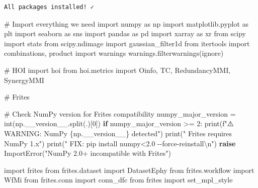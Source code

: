 \documentclass[
  11pt,
  letterpaper,
  oneside,
  openany]{book}
\newenvironment{Shaded}{\begin{snugshade}}{\end{snugshade}}
\newcommand{\BuiltInTok}[1]{\textcolor[rgb]{0.00,0.23,0.31}{#1}}
\newcommand{\CharTok}[1]{\textcolor[rgb]{0.13,0.47,0.30}{#1}}
\newcommand{\CommentTok}[1]{\textcolor[rgb]{0.37,0.37,0.37}{#1}}
\newcommand{\ControlFlowTok}[1]{\textcolor[rgb]{0.00,0.23,0.31}{\textbf{#1}}}
\newcommand{\DecValTok}[1]{\textcolor[rgb]{0.68,0.00,0.00}{#1}}
\newcommand{\ImportTok}[1]{\textcolor[rgb]{0.00,0.46,0.62}{#1}}
\newcommand{\NormalTok}[1]{\textcolor[rgb]{0.00,0.23,0.31}{#1}}
\newcommand{\OperatorTok}[1]{\textcolor[rgb]{0.37,0.37,0.37}{#1}}
\newcommand{\PreprocessorTok}[1]{\textcolor[rgb]{0.68,0.00,0.00}{#1}}
\newcommand{\SpecialCharTok}[1]{\textcolor[rgb]{0.37,0.37,0.37}{#1}}
\newcommand{\SpecialStringTok}[1]{\textcolor[rgb]{0.13,0.47,0.30}{#1}}
\newcommand{\StringTok}[1]{\textcolor[rgb]{0.13,0.47,0.30}{#1}}
\begin{document}
\begin{verbatim}
All packages installed! ✓
\end{verbatim}

\begin{Shaded}
\begin{Highlighting}[]
\CommentTok{\# Import everything we need}
\ImportTok{import}\NormalTok{ numpy }\ImportTok{as}\NormalTok{ np}
\ImportTok{import}\NormalTok{ matplotlib.pyplot }\ImportTok{as}\NormalTok{ plt}
\ImportTok{import}\NormalTok{ seaborn }\ImportTok{as}\NormalTok{ sns}
\ImportTok{import}\NormalTok{ pandas }\ImportTok{as}\NormalTok{ pd}
\ImportTok{import}\NormalTok{ xarray }\ImportTok{as}\NormalTok{ xr}
\ImportTok{from}\NormalTok{ scipy }\ImportTok{import}\NormalTok{ stats}
\ImportTok{from}\NormalTok{ scipy.ndimage }\ImportTok{import}\NormalTok{ gaussian\_filter1d}
\ImportTok{from}\NormalTok{ itertools }\ImportTok{import}\NormalTok{ combinations, product}
\ImportTok{import}\NormalTok{ warnings}
\NormalTok{warnings.filterwarnings(}\StringTok{\textquotesingle{}ignore\textquotesingle{}}\NormalTok{)}

\CommentTok{\# HOI}
\ImportTok{import}\NormalTok{ hoi}
\ImportTok{from}\NormalTok{ hoi.metrics }\ImportTok{import}\NormalTok{ Oinfo, TC, RedundancyMMI, SynergyMMI}

\CommentTok{\# Frites}

\CommentTok{\# Check NumPy version for Frites compatibility}
\NormalTok{numpy\_major\_version }\OperatorTok{=} \BuiltInTok{int}\NormalTok{(np.\_\_version\_\_.split(}\StringTok{\textquotesingle{}.\textquotesingle{}}\NormalTok{)[}\DecValTok{0}\NormalTok{])}
\ControlFlowTok{if}\NormalTok{ numpy\_major\_version }\OperatorTok{\textgreater{}=} \DecValTok{2}\NormalTok{:}
    \BuiltInTok{print}\NormalTok{(}\SpecialStringTok{f"⚠️  WARNING: NumPy }\SpecialCharTok{\{}\NormalTok{np}\SpecialCharTok{.}\NormalTok{\_\_version\_\_}\SpecialCharTok{\}}\SpecialStringTok{ detected"}\NormalTok{)}
    \BuiltInTok{print}\NormalTok{(}\StringTok{"   Frites requires NumPy 1.x"}\NormalTok{)}
    \BuiltInTok{print}\NormalTok{(}\StringTok{"   FIX: pip install \textquotesingle{}numpy\textless{}2.0\textquotesingle{} {-}{-}force{-}reinstall}\CharTok{\textbackslash{}n}\StringTok{"}\NormalTok{)}
    \ControlFlowTok{raise} \PreprocessorTok{ImportError}\NormalTok{(}\StringTok{"NumPy 2.0+ incompatible with Frites"}\NormalTok{)}

\ImportTok{import}\NormalTok{ frites}
\ImportTok{from}\NormalTok{ frites.dataset }\ImportTok{import}\NormalTok{ DatasetEphy}
\ImportTok{from}\NormalTok{ frites.workflow }\ImportTok{import}\NormalTok{ WfMi}
\ImportTok{from}\NormalTok{ frites.conn }\ImportTok{import}\NormalTok{ conn\_dfc}
\ImportTok{from}\NormalTok{ frites }\ImportTok{import}\NormalTok{ set\_mpl\_style}


\end{Highlighting}
\end{Shaded}
\end{document}
